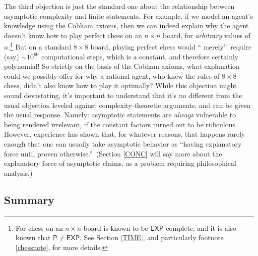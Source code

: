 \documentclass[12pt,onecolumn]{article}%
\begin{document}
The third objection is just the standard one about the relationship between
asymptotic complexity and finite statements. For example, if we model an
agent's knowledge using the Cobham axioms, then we can indeed explain why the
agent doesn't know how to play perfect chess on an $n\times n$ board, for
\textit{arbitrary} values of $n$.\footnote{For chess on an $n\times n$ board
is known to be $\mathsf{EXP}$-complete, and it is also known that
$\mathsf{P}\neq\mathsf{EXP}$. See Section \ref{TIME}, and particularly
footnote \ref{chessnote}, for more details.} But on a standard $8\times
8$ board, playing perfect chess would \textquotedblleft
merely\textquotedblright\  require (say) $\sim10^{60}$ computational steps,
which is a constant, and therefore certainly polynomial! So strictly on the
basis of the Cobham axioms, what explanation could we possibly offer for why a
rational agent, who knew the rules of $8\times8$ chess, didn't also know how
to play it optimally? While this objection might sound devastating, it's
important to understand that it's no different from the usual objection
leveled against complexity-theoretic arguments, and can be given the usual
response. Namely: asymptotic statements are \textit{always} vulnerable to
being rendered irrelevant, if the constant factors turned out to be
ridiculous. However, experience has shown that, for whatever reasons, that
happens rarely enough that one can usually take asymptotic behavior as
\textquotedblleft having explanatory force until proven
otherwise.\textquotedblright\  (Section \ref{CONC} will say more about the
explanatory force of asymptotic claims, as a problem requiring philosophical analysis.)

\subsection{Summary}
\end{document}
